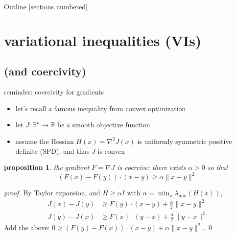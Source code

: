 \documentclass[10pt,svgnames]{beamer}
\newtheorem*{proposition}{proposition}
\newcommand{\RR}{\mathbb{R}}
\newcommand{\grad}{\nabla}
\newcommand{\aler}[1]{{\color{FireBrick} #1}}
\begin{document}
\begin{frame}{Outline}
  [sections numbered]
  \tableofcontents%
\end{frame}

\AtBeginSection[]
{%
}

\section{variational inequalities (VIs)}

\subsection{(and coercivity)}

\begin{frame}{reminder: coercivity for gradients}

\begin{itemize}
\item let's recall a famous inequality from convex optimization
\item let $J: \RR^n \to \RR$ be a smooth objective function
\item assume the Hessian $H(x)=\grad^2 J(x)$ is uniformly symmetric positive definite (SPD), and thus $J$ is convex
\end{itemize}

\bigskip
\begin{proposition}
the gradient $F=\nabla J$ is \aler{coercive}: there exists $\alpha > 0$ so that
$$(F(x) - F(y)) \cdot (x - y) \ge \alpha \|x - y\|^2$$
\end{proposition}

\emph{proof.} By Taylor expansion, and $H \ge \alpha I$ with $\alpha=\min_{x} \lambda_{\text{min}}(H(x))$,
\begin{align*}
J(x) - J(y) &\ge F(y) \cdot (x - y) + \frac{\alpha}{2} \|x-y\|^2 \\
J(y) - J(x) &\ge F(x) \cdot (y - x) + \frac{\alpha}{2} \|y-x\|^2
\end{align*}
Add the above: \quad $0 \ge (F(y) - F(x)) \cdot (x-y) +  \alpha \|x - y\|^2$. \qed
\end{frame}
\end{document}
